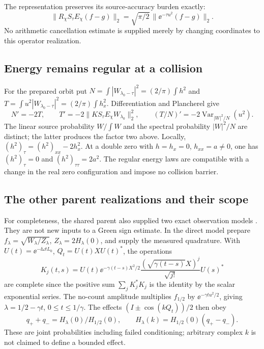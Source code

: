 The representation preserves its source-accuracy burden exactly:
\begin{equation}\label{eq:operator-error}
 \|R_\chi S_\tau E_\chi(f-g)\|_2
 =\sqrt{\pi/2}\,\|\ee^{-\tau u^2}(f-g)\|_2.
\end{equation}
No arithmetic cancellation estimate is supplied merely by changing
coordinates to this operator realization.

\subsection{Energy remains regular at a collision}
For the prepared orbit put
\(N=\int|W_{\lambda_0-\tau}|^2=(2/\pi)\int h^2\) and
\(T=\int u^2|W_{\lambda_0-\tau}|^2=(2/\pi)\int h_x^2\).
Differentiation and Plancherel give
\begin{equation}\label{eq:energy-laws}
 N'=-2T,\qquad T'=-2\|K S_\tau E_\chi W_{\lambda_0}\|_2^2,
 \qquad (T/N)'=-2\operatorname{Var}_{|W|^2/N}(u^2).
\end{equation}
The linear source probability \(W/\int W\) and the spectral probability
\(|W|^2/N\) are distinct; the latter produces the factor two above.
Locally, \((h^2)_\tau=(h^2)_{xx}-2h_x^2\). At a double zero with
\(h=h_x=0\), \(h_{xx}=a\ne0\), one has
\((h^2)_\tau=0\) and \((h^2)_{\tau\tau}=2a^2\).
The regular energy laws are compatible with a change in the real zero
configuration and impose no collision barrier.

\subsection{The other parent realizations and their scope}
For completeness, the shared parent also supplied two exact observation
models \cite{TNDDirect,TNDAux}. They are not new inputs to a Green sign
estimate. In the direct model prepare
\(f_\lambda=\sqrt{W_\lambda/Z_\lambda}\), \(Z_\lambda=2H_\lambda(0)\),
and supply the measured quadrature. With
\(U(t)=\ee^{-\ii\omega tL_0}\), \(Q_t=U(t)XU(t)^*\), the operations
\[
 K_j(t,s)=U(t)\ee^{-\gamma(t-s)X^2/2}
       \frac{(\sqrt{\gamma(t-s)}X)^j}{\sqrt{j!}}U(s)^*
\]
are complete since the positive sum \(\sum_jK_j^*K_j\) is the identity
by the scalar exponential series. The no-count amplitude multiplies
\(f_{1/2}\) by \(\ee^{-\gamma t u^2/2}\), giving
\(\lambda=1/2-\gamma t\), \(0\le t\le1/\gamma\). The effects
\((I\pm\cos(kQ_t))/2\) then obey
\[
 q_++q_-=H_\lambda(0)/H_{1/2}(0),\qquad
 H_\lambda(k)=H_{1/2}(0)(q_+-q_-).
\]
These are joint probabilities including failed conditioning; arbitrary
complex \(k\) is not claimed to define a bounded effect.

